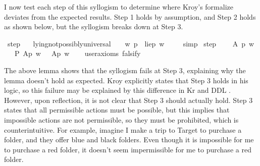 \begin{isabellebody}
\begin{isamarkuptext}
I now test each step of this syllogism to determine where Kroy's formalize deviates from the
expected results. Step 1 holds by assumption, and Step 2 holds as shown below, but the syllogism breaks down
at Step 3.%
\end{isamarkuptext}\isamarkuptrue%
\isamarkupfalse%
\ step{}{\isacharcolon}\isanewline
\ \ \ {\isachardoublequoteopen}lying{\isacharunderscore}not{\isacharunderscore}possibly{\isacharunderscore}universal\ {\isasymlongrightarrow}\ {\isasymTurnstile}{\isacharparenleft}\ {\isacharparenleft}{\isasymbox}\ {\isacharparenleft}{\isasymlambda}w{\isachardot}\ {\isasymexists}p{\isachardot}\ {\isacharparenleft}\isactrlbold {\isasymnot}\ {\isacharparenleft}lie{\isacharparenleft}p{\isacharparenright}{\isacharparenright}\ w{\isacharparenright}{\isacharparenright}{\isacharparenright}{\isacharparenright}\ {\isachardoublequoteclose}\isanewline
%
\isadelimproof
\ \ %
\endisadelimproof
%
\isatagproof
{}\isamarkupfalse%
\ simp\isanewline
%
%
\endisatagproof
{\isafoldproof}%
%
\isadelimproof
\isanewline
%
\endisadelimproof
{}\isamarkupfalse%
\ step{}{\isacharcolon}\ \isanewline
\ \ \ A\ p\ w\isanewline
\ \ \ {\isachardoublequoteopen}P\ {\isacharbraceleft}A{\isacharparenleft}p{\isacharparenright}{\isacharbraceright}\ w\ {\isasymlongrightarrow}\ {\isacharparenleft}{\isasymdiamond}\ {\isacharparenleft}A{\isacharparenleft}p{\isacharparenright}{\isacharparenright}\ w{\isacharparenright}{\isachardoublequoteclose}\isanewline
\ \ \isamarkupfalse%
\ {\isacharbrackleft}user{\isacharunderscore}axioms{\isacharcomma}\ falsify{\isacharbrackright}%
\isadelimproof
\ %
\endisadelimproof
%
\isatagproof
{}\isamarkupfalse%
\isanewline
%
%
\endisatagproof
{\isafoldproof}%
%
\isadelimproof
%
\endisadelimproof
%
\begin{isamarkuptext}%
The above lemma shows that the syllogism fails at Step 3, explaining why the lemma doesn't 
        hold as expected. Kroy explicitly states that 
        Step 3 holds in his logic, so this failure may be explained by this difference in Kr and DDL \citep[footnote 19, 199]{kroy}.
        However, upon reflection, it is not clear that Step 3 should actually hold.
        Step 3 states that all permissible actions must be possible, but this implies that impossible
        actions are not permissible, so they must be prohibited, which is counterintuitive. For example, 
        imagine I make a trip to Target to purchase a folder, and they offer blue and black folders. 
        Even though it is impossible for me to purchase a red folder, it doesn't seem impermissible
        for me to purchase a red folder.


\end{isamarkuptext}
\end{isabellebody}
